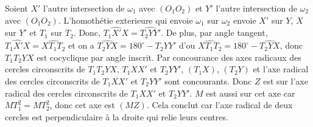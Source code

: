 \begin{sol}
\begin{center}
\end{center}

Soient $X'$ l'autre intersection de $\omega_1$ avec $\left(O_1 O_2\right)$ et $Y'$ l'autre intersection de $\omega_2$ avec $\left(O_1 O_2\right)$. L'homothétie exterieure qui envoie $\omega_1$ sur $\omega_2$ envoie $X'$ sur $Y$, $X$ sur $Y'$ et $T_1$ sur $T_2$. Donc, $\widehat{T_1 X' X} = \widehat{T_2 Y Y'}$. De plus, par angle tangent, $\widehat{T_1 X' X} = \widehat{X T_1 T_2}$ et on a $\widehat{T_2 Y X} = 180^\circ - \widehat{T_2 Y Y'}$ d'ou $\widehat{X T_1 T_2} = 180^\circ - \widehat{T_2 Y X}$, donc $T_1 T_2 Y X$ est cocyclique par angle inscrit. Par concourance des axes radicaux des cercles circonscrits de $T_1 T_2 Y X$, $T_1 X X'$ et $T_2 Y Y'$, $\left(T_1 X\right)$, $\left(T_2 Y\right)$ et l'axe radical des cercles circonscrits de $T_1 X X'$ et $T_2 Y Y'$ sont concourants. Donc $Z$ est sur l'axe radical des cercles circonscrits de $T_1 X X'$ et $T_2 Y Y'$. $M$ est aussi sur cet axe car $MT_1^2 = MT_2^2$, donc cet axe est $\left(MZ\right)$. Cela conclut car l'axe radical de deux cercles est perpendiculaire à la droite qui relie leurs centres.
\end{sol}


